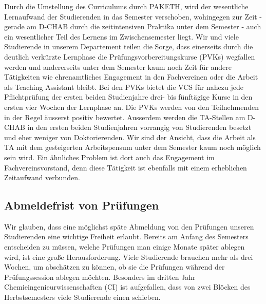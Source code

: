 \documentclass{article}
\begin{document}
Durch die Umstellung des Curriculums durch PAKETH, wird der wesentliche Lernaufwand der Studierenden in das Semester verschoben, wohingegen zur Zeit - gerade am D-CHAB durch die zeitintensiven Praktika unter dem Semester - auch ein wesentlicher Teil des Lernens im Zwischensemester liegt. Wir und viele Studierende in unserem Departement teilen die Sorge, dass einerseits durch die deutlich verkürzte Lernphase die Prüfungsvorbereitungskurse (PVKs) wegfallen werden und andererseits unter dem Semester kaum noch Zeit für andere Tätigkeiten wie ehrenamtliches Engagement in den Fachvereinen oder die Arbeit als Teaching Assistant bleibt. Bei den PVKs bietet die VCS für nahezu jede Pflichtprüfung der ersten beiden Studienjahre drei- bis fünftägige Kurse in den ersten vier Wochen der Lernphase an. Die PVKs werden von den Teilnehmenden in der Regel äusserst positiv bewertet. Ausserdem werden die TA-Stellen am D-CHAB in den ersten beiden Studienjahren vorrangig von Studierenden besetzt und eher weniger von Doktorierenden. Wir sind der Ansicht, dass die Arbeit als TA mit dem gesteigerten Arbeitspensum unter dem Semester kaum noch möglich sein wird. Ein ähnliches Problem ist dort auch das Engagement im Fachvereinsvorstand, denn diese Tätigkeit ist ebenfalls mit einem erheblichen Zeitaufwand verbunden.


\subsection{Abmeldefrist von Prüfungen}
Wir glauben, dass eine möglichst späte Abmeldung von den Prüfungen unseren Studierenden eine wichtige Freiheit erlaubt. Bereits am Anfang des Semesters entscheiden zu müssen, welche Prüfungen man einige Monate später ablegen wird, ist eine große Herausforderung. Viele Studierende brauchen mehr als drei Wochen, um abschätzen zu können, ob sie die Prüfungen während der Prüfungssession ablegen möchten. Besonders im dritten Jahr Chemieingenieurwissenschaften (CI) ist aufgefallen, dass von zwei Blöcken des Herbstsemesters viele Studierende einen schieben. \\
\end{document}
